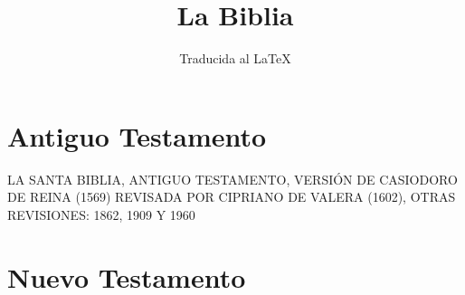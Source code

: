 \documentclass[oneside, twocolumn,  10pt]{book}
\begin{document}
	
	\frontmatter
	\title{La Biblia}
	\author{Traducida al LaTeX}
	\date{}
	\maketitle
	
	\tableofcontents
	
	\mainmatter
	
	\part{Antiguo Testamento}
	\onecolumn
	
	LA SANTA BIBLIA, ANTIGUO TESTAMENTO, VERSIÓN DE CASIODORO DE REINA (1569)
	REVISADA POR CIPRIANO DE VALERA (1602), OTRAS REVISIONES: 1862, 1909 Y 1960
	

	\twocolumn
	
%	
%	
%	
%	
%	
%	
%	
%	
%	
%	
%	
%	
%	
%	
%	
%	
%	
%	
%	
%	
%	
%	
%	
%	
%	
%	
%	
%	
%	
%	
%	
%	
%	
%	
%	
%	
%	
%	
%	
%	
	
\part{Nuevo Testamento}	





	
	
\end{document}
